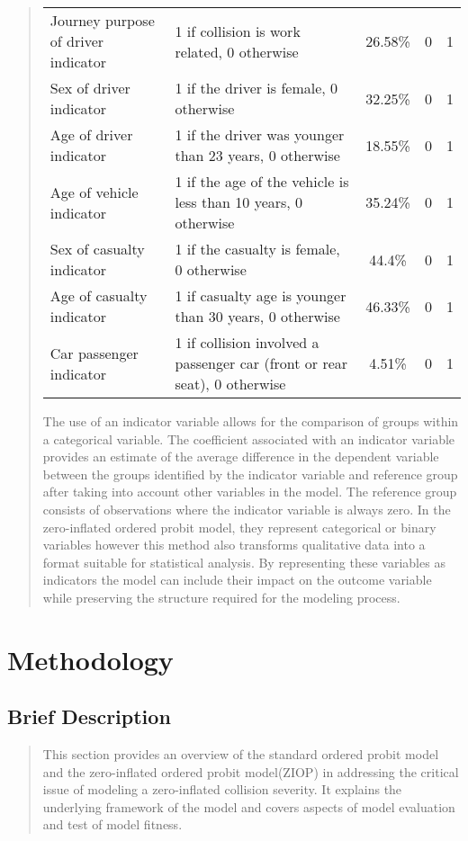 \documentclass[12]{report}
\begin{document}
\begin{quote}
{\begin{table}[H]
\begin{tabular}{p{4cm} p{8cm} c c c}
Journey purpose of driver indicator & 1 if collision is work related, 0 otherwise & 26.58\% & 0 & 1 \\

Sex of driver indicator & 1 if the driver is female, 0 otherwise & 32.25\% & 0 & 1 \\

Age of driver indicator & 1 if the driver was younger than 23 years, 0 otherwise & 18.55\% & 0 & 1 \\

Age of vehicle indicator & 1 if the age of the vehicle is less than 10 years, 0 otherwise & 35.24\% & 0 & 1 \\

Sex of casualty indicator & 1 if the casualty is female, 0 otherwise & 44.4\% & 0 & 1 \\

Age of casualty indicator & 1 if casualty age is younger than 30 years, 0 otherwise & 46.33\% & 0 & 1 \\

Car passenger indicator & 1 if collision involved a passenger car (front or rear seat), 0 otherwise & 4.51\% & 0 & 1 \\
\bottomrule
\end{tabular}
\end{table}


The use of an indicator variable allows for the comparison of groups within a categorical variable. The coefficient associated with an indicator variable provides an estimate of the average difference in the dependent variable between the groups identified by the indicator variable and reference group after taking into account other variables in the model. The reference group consists of observations where the indicator variable is always zero. In the zero-inflated ordered probit model, they represent categorical or binary variables however this method also transforms qualitative data into a format suitable for statistical analysis.  By representing these variables as indicators the model can include their impact on the outcome variable while preserving the structure required for the modeling process.
}
\end{quote}


\chapter{Methodology}
\section{Brief Description}
\begin{quote}
{\large 
This section provides an overview of the standard ordered probit model and the  zero-inflated ordered probit model(ZIOP) in addressing the critical issue of modeling a zero-inflated collision severity. It explains the underlying framework of the model and covers aspects of model evaluation and test of model fitness.}\end{quote}
\end{document}
